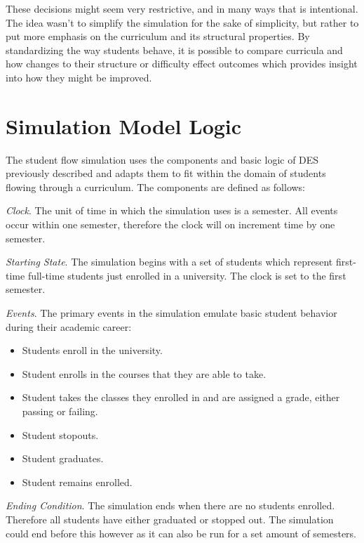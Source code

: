 \documentclass[botnum, fleqn]{unmeethesis}
\begin{document}
  These decisions might seem very restrictive, and in many ways that is intentional. The idea wasn't to simplify the simulation for the sake of simplicity, but rather to put more emphasis on the curriculum and its structural properties. By standardizing the way students behave, it is possible to compare curricula and how changes to their structure or difficulty effect outcomes which provides insight into how they might be improved.

  \section{Simulation Model Logic}
  The student flow simulation uses the components and basic logic of DES previously described and adapts them to fit within the domain of students flowing through a curriculum. The components are defined as follows:

  \textit{Clock}. The unit of time in which the simulation uses is a semester. All events occur within one semester, therefore the clock will on increment time by one semester.

  \textit{Starting State}. The simulation begins with a set of students which represent first-time full-time students just enrolled in a university. The clock is set to the first semester.

  \textit{Events}. The primary events in the simulation emulate basic student behavior during their academic career:
  \begin{itemize}
    \item Students enroll in the university.
    \item Student enrolls in the courses that they are able to take.
    \item Student takes the classes they enrolled in and are assigned a grade, either passing or failing.
    \item Student stopouts.
    \item Student graduates.
    \item Student remains enrolled.
  \end{itemize}

  \textit{Ending Condition}. The simulation ends when there are no students enrolled. Therefore all students have either graduated or stopped out. The simulation could end before this however as it can also be run for a set amount of semesters.

\end{document}
